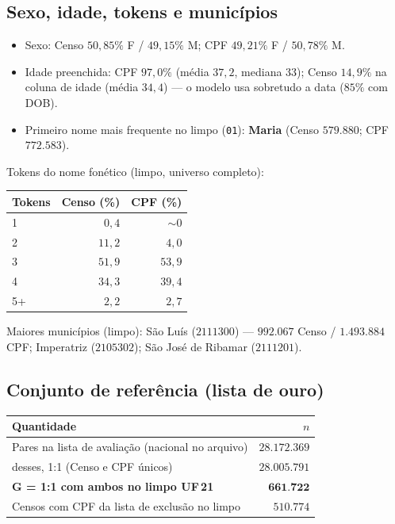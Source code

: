 \documentclass[11pt,a4paper]{article}
\begin{document}
\subsection{Sexo, idade, tokens e municípios}

\begin{itemize}
  \item Sexo: Censo $50{,}85\%$ F / $49{,}15\%$ M; CPF $49{,}21\%$ F /
        $50{,}78\%$ M.
  \item Idade preenchida: CPF $97{,}0\%$ (média $37{,}2$, mediana $33$);
        Censo $14{,}9\%$ na coluna de idade (média $34{,}4$) --- o modelo
        usa sobretudo a data ($85\%$ com DOB).
  \item Primeiro nome mais frequente no limpo (\texttt{01}): \textbf{Maria}
        (Censo $579{.}880$; CPF $772{.}583$).
\end{itemize}

Tokens do nome fonético (limpo, universo completo):

\begin{center}
\begin{tabular}{@{}lrr@{}}
\toprule
Tokens & Censo (\%) & CPF (\%) \\
\midrule
1 & $0{,}4$ & $\sim 0$ \\
2 & $11{,}2$ & $4{,}0$ \\
3 & $51{,}9$ & $53{,}9$ \\
4 & $34{,}3$ & $39{,}4$ \\
5+ & $2{,}2$ & $2{,}7$ \\
\bottomrule
\end{tabular}
\end{center}

Maiores municípios (limpo): São Luís ($2111300$) --- $992{.}067$ Censo /
$1{.}493{.}884$ CPF; Imperatriz ($2105302$); São José de Ribamar ($2111201$).

\subsection{Conjunto de referência (lista de ouro)}

\begin{center}
\begin{tabular}{@{}lr@{}}
\toprule
Quantidade & $n$ \\
\midrule
Pares na lista de avaliação (nacional no arquivo) & $28{.}172{.}369$ \\
desses, 1:1 (Censo e CPF únicos) & $28{.}005{.}791$ \\
\textbf{G = 1:1 com ambos no limpo UF\,21} & $\mathbf{661{.}722}$ \\
Censos com CPF da lista de exclusão no limpo & $510{.}774$ \\
\bottomrule
\end{tabular}
\end{center}
\end{document}
